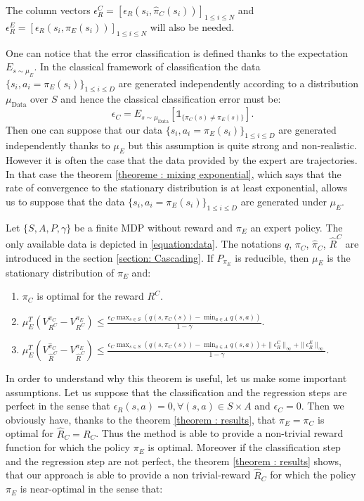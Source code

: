 \documentclass{llncs}
\newcommand{\0}{\mathbf{0}}
\newcommand{\1}{\mathbf{1}}
\begin{document}
The column vectors $\epsilon^C_R=[\epsilon_R(s_i,\hat{\pi}_C(s_i))]_{1\leq i \leq N}$ and $\epsilon^E_R=[\epsilon_R(s_i,\pi_E(s_i))]_{1\leq i \leq N}$ will also be needed.
\begin{remark}
One can notice that the error classification is defined thanks to the expectation $E_{s \sim \mu_E}$. In the classical framework of classification the data $\{s_i,a_i=\pi_E(s_i)\}_{1\leq i \leq D}$
are generated independently according to a distribution $\mu_{\text{Data}}$ over $S$ and hence the classical classification error must be:
\begin{equation}
\epsilon_C=E_{s \sim \mu_{\text{Data}}}[\mathds{1}_{\{\pi_C(s)\neq\pi_E(s)\}}].
\end{equation}
Then one can suppose that our data $\{s_i,a_i=\pi_E(s_i)\}_{1\leq i \leq D}$ are generated independently thanks to $\mu_E$ but this assumption is quite strong and non-realistic.
However it is often the case that the data provided by the expert are trajectories. In that case the theorem \ref{theoreme : mixing exponential}, which says that the rate of convergence
to the stationary distribution is at least exponential, allows us to suppose that the data $\{s_i,a_i=\pi_E(s_i)\}_{1\leq i \leq D}$ are generated under $\mu_E$.
\end{remark}
\begin{theorem}
\label{theorem : results}
Let $\{S,A,P,\gamma\}$ be a finite MDP without reward and $\pi_E$ an expert policy. The only available data is depicted in \eqref{equation:data}.
The notations $q$, $\pi_C$, $\hat{\pi}_C$, $\hat{R}^C$ are introduced in the section \ref{section: Cascading}.
If $P_{\pi_E}$ is reducible, then $\mu_E$ is the stationary distribution of $\pi_E$ and:
\begin{enumerate}
\item $\pi_C$ is optimal for the reward $R^C$.
\item $\mu_E^T(V^{\pi_C}_{R^C}-V^{\pi_E}_{R^C})\leq\frac{\epsilon_C\max_{s\in S}(q(s,\pi_C(s))-\min_{a\in A}q(s,a))}{1-\gamma}$.
\item $\mu_E^T(V^{\hat{\pi}_C}_{\hat{R}^C}-V^{\pi_E}_{\hat{R}^C})\leq \frac{\epsilon_C\max_{s\in S}(q(s,\pi_C(s))-\min_{a\in A}q(s,a))+\|\epsilon^C_R\|_{\infty}+\|\epsilon^E_R\|_{\infty}}{1-\gamma}$.
\end{enumerate}
\end{theorem}
In order to understand why this theorem is useful, let us make some important assumptions. Let us suppose that the classification and the regression steps are perfect in the sense that $\epsilon_R(s,a)=0,\forall (s,a)\in S\times A$ and $\epsilon_C=0$. Then we obviously have, thanks to the theorem \ref{theorem : results}, that $\pi_E=\pi_C$ is optimal for $\hat{R}_C=R_C$. Thus the method is able to provide a non-trivial reward function for which the policy $\pi_E$ is optimal. Moreover if the classification step and the regression step are not perfect, the theorem \ref{theorem : results} shows, that our approach is able to provide a non trivial-reward $\hat{R}_C$ for which the policy $\pi_E$ is near-optimal in the sense that:
\end{document}
